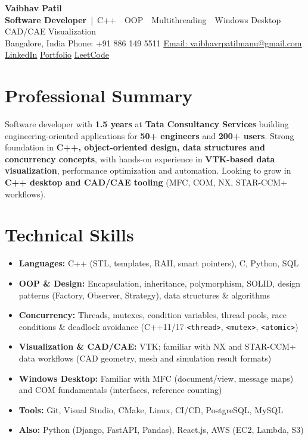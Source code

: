 \documentclass[letterpaper,11pt]{article}
\newcommand{\resumeItem}[1]{\item\small{{#1 \vspace{-2pt}}}}
\newcommand{\resumeItemListStart}{\begin{itemize}}
\newcommand{\resumeItemListEnd}{\end{itemize}\vspace{-6pt}}
\begin{document}
\begin{center}
    {\Huge \bfseries Vaibhav Patil} \\ \vspace{1pt}
    {\small \textbf{Software Developer} \,|\, C++ \,\textbullet\, OOP \,\textbullet\, Multithreading \,\textbullet\, Windows Desktop \,\textbullet\, CAD/CAE Visualization} \\ \vspace{1pt}
    \small
    {Bangalore, India} \quad
    {Phone: +91 886 149 5511} \quad
    \underline{\href{mailto:vaibhavrpatilmanu@gmail.com}{Email: vaibhavrpatilmanu@gmail.com}} \quad
    \underline{\href{https://www.linkedin.com/in/vaibhavrp614/}{LinkedIn}} \quad
    \underline{\href{https://vaibhav88614.github.io/}{Portfolio}} \quad
    \underline{\href{https://leetcode.com/u/Vaibhav614/}{LeetCode}}
    \vspace{-8pt}
\end{center}

\section*{Professional Summary}
Software developer with \textbf{1.5 years} at \textbf{Tata Consultancy Services} building engineering-oriented applications for \textbf{50+ engineers} and \textbf{200+ users}. Strong foundation in \textbf{C++, object-oriented design, data structures and concurrency concepts}, with hands-on experience in \textbf{VTK-based data visualization}, performance optimization and automation. Looking to grow in \textbf{C++ desktop and CAD/CAE tooling} (MFC, COM, NX, STAR-CCM+ workflows).

\section{Technical Skills}
\resumeItemListStart
  \setlength{\itemsep}{1pt}
  \resumeItem{\textbf{Languages:} C++ (STL, templates, RAII, smart pointers), C, Python, SQL}
  \resumeItem{\textbf{OOP \& Design:} Encapsulation, inheritance, polymorphism, SOLID, design patterns (Factory, Observer, Strategy), data structures \& algorithms}
  \resumeItem{\textbf{Concurrency:} Threads, mutexes, condition variables, thread pools, race conditions \& deadlock avoidance (C++11/17 \texttt{<thread>}, \texttt{<mutex>}, \texttt{<atomic>})}
  \resumeItem{\textbf{Visualization \& CAD/CAE:} VTK; familiar with NX and STAR-CCM+ data workflows (CAD geometry, mesh and simulation result formats)}
  \resumeItem{\textbf{Windows Desktop:} Familiar with MFC (document/view, message maps) and COM fundamentals (interfaces, reference counting)}
  \resumeItem{\textbf{Tools:} Git, Visual Studio, CMake, Linux, CI/CD, PostgreSQL, MySQL}
  \resumeItem{\textbf{Also:} Python (Django, FastAPI, Pandas), React.js, AWS (EC2, Lambda, S3)}
\resumeItemListEnd
\end{document}
